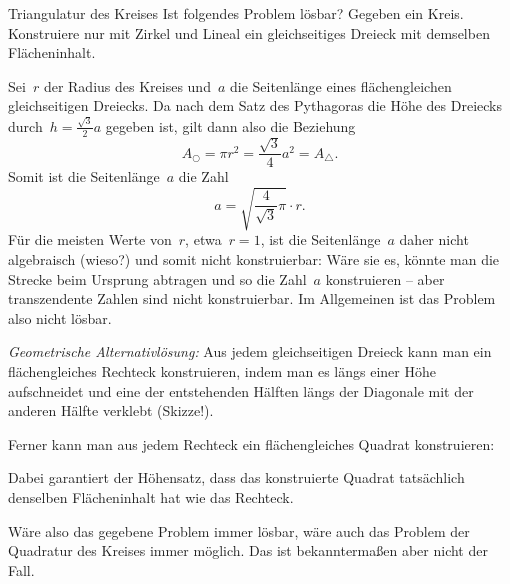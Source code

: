 \documentclass{algblatt}
\begin{document}
\begin{aufgabe}{Triangulatur des Kreises}
Ist folgendes Problem lösbar? Gegeben ein Kreis. Konstruiere nur mit Zirkel und
Lineal ein gleichseitiges Dreieck mit demselben Flächeninhalt.

\begin{loesung}
Sei~$r$ der Radius des Kreises und~$a$ die Seitenlänge eines flächengleichen
gleichseitigen Dreiecks. Da nach dem Satz des Pythagoras die Höhe des Dreiecks
durch~$h = \frac{\sqrt{3}}{2} a$ gegeben ist, gilt dann also die Beziehung
\[ A_\bigcirc = \pi r^2 = \frac{\sqrt{3}}{4} a^2 = A_\triangle. \]
Somit ist die Seitenlänge~$a$ die Zahl
\[ a = \sqrt{\frac{4}{\sqrt{3}} \pi} \cdot r. \]
Für die meisten Werte von~$r$, etwa~$r = 1$, ist die Seitenlänge~$a$ daher
nicht algebraisch (wieso?) und somit nicht konstruierbar: Wäre sie es, könnte
man die Strecke beim Ursprung abtragen und so die Zahl~$a$ konstruieren -- aber
transzendente Zahlen sind nicht konstruierbar. Im Allgemeinen ist das Problem
also nicht lösbar.

\emph{Geometrische Alternativlösung:}
Aus jedem gleichseitigen Dreieck kann man ein flächengleiches Rechteck
konstruieren, indem man es längs einer Höhe aufschneidet und eine der
entstehenden Hälften längs der Diagonale mit der anderen Hälfte verklebt
(Skizze!).

Ferner kann man aus jedem Rechteck ein flächengleiches Quadrat konstruieren:
\begin{center}
  \scalebox{0.5}{}
\end{center}
Dabei garantiert der Höhensatz, dass das konstruierte Quadrat tatsächlich
denselben Flächeninhalt hat wie das Rechteck.

Wäre also das gegebene Problem immer lösbar, wäre auch das Problem der
Quadratur des Kreises immer möglich. Das ist bekanntermaßen aber nicht der
Fall.
\end{loesung}
\end{aufgabe}
\end{document}
